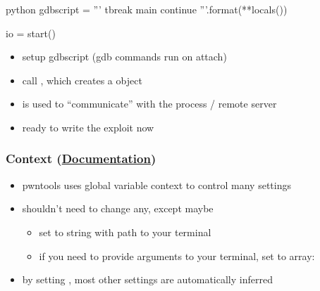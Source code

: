 \documentclass[aspectratio=169]{beamer}
\newcommand{\docl}[1]{(\textbf{\href{#1}{Documentation}})}
\begin{document}
{\begin{frame}[fragile]
\end{frame}
\begin{frame}[fragile]

\begin{codebox}{python}
gdbscript = '''
tbreak main
continue
'''.format(**locals())

io = start()\end{codebox}
\begin{itemize}
    \item setup gdbscript (gdb commands run on attach)
    \item call , which creates a  object
    \item {} is used to ``communicate'' with the process / remote server
    \item ready to write the exploit now
\end{itemize}
\end{frame}

\begin{frame}[fragile]
    \frametitle{Context \docl{http://docs.pwntools.com/en/stable/context.html}}
    \begin{itemize}
        \item pwntools uses global variable context to control many settings
        \item shouldn't need to change any, except maybe 
        \begin{itemize}
            \item set to string with path to your terminal
            \item if you need to provide arguments to your terminal, set to array: 
        \end{itemize}
        \item by setting , most other settings are automatically inferred
    \end{itemize}
\end{frame}

}
\end{document}
